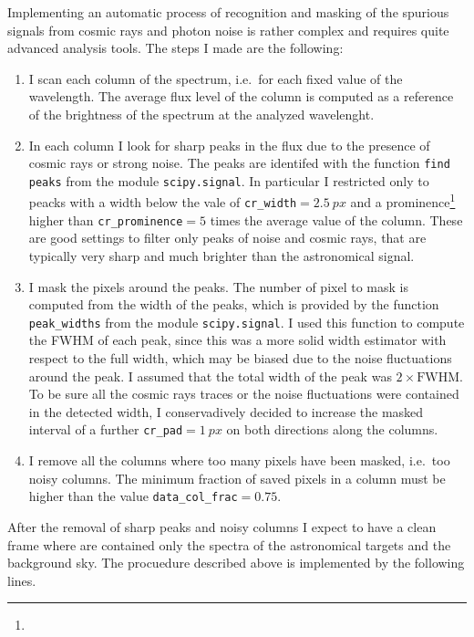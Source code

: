 Implementing an automatic process of recognition and masking of the spurious signals from cosmic rays and photon noise is rather complex and requires quite advanced analysis tools. The steps I made are the following:
\begin{enumerate}
	\item I scan each column of the spectrum, i.e.\ for each fixed value of the wavelength. The average flux level of the column is computed as a reference of the brightness of the spectrum at the analyzed wavelenght.
	\item In each column I look for sharp peaks in the flux due to the presence of cosmic rays or strong noise. The peaks are identifed with the function \texttt{find peaks} from the module \texttt{scipy.signal}. In particular I restricted only to peacks with a width below the vale of \texttt{cr\_width}$=\SI{2.5}{px}$ and a prominence\footnote{} higher than \texttt{cr\_prominence}$=5$ times the average value of the column. These are good settings to filter only peaks of noise and cosmic rays, that are typically very sharp and much brighter than the astronomical signal.
	\item I mask the pixels around the peaks. The number of pixel to mask is computed from the width of the peaks, which is provided by the function \texttt{peak\_widths} from the module \texttt{scipy.signal}. I used this function to compute the FWHM of each peak, since this was a more solid width estimator with respect to the full width, which may be biased due to the noise fluctuations around the peak. I assumed that the total width of the peak was $2\times\text{FWHM}$. To be sure all the cosmic rays traces or the noise 
fluctuations were contained in the detected width, I conservadively decided to increase the masked interval of a further \texttt{cr\_pad}$=\SI{1}{px}$ on both directions along the columns.
	\item I remove all the columns where too many pixels have been masked, i.e.\ too noisy columns. The minimum fraction of saved pixels in a column must be higher than the value \texttt{data\_col\_frac}$=0.75$.	
\end{enumerate}
After the removal of sharp peaks and noisy columns I expect to have a clean frame where are contained only the spectra of the astronomical targets and the background sky. The procuedure described above is implemented by the following lines.
